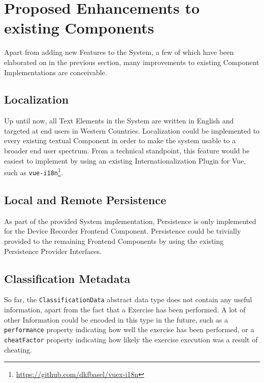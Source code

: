 \section{Proposed Enhancements to existing Components}
Apart from adding new Features to the System, a few of which have been elaborated on in the previous section, many improvements to existing Component Implementations are conceivable.

\subsection{Localization}
Up until now, all Text Elements in the System are written in English and targeted at end users in Western Countries. Localization could be implemented to every existing textual Component in order to make the system usable to a broader end user spectrum. From a technical standpoint, this feature would be easiest to implement by using an existing Internationalization Plugin for Vue, such as \texttt{vue-i18n}\footnote{\url{https://github.com/dkfbasel/vuex-i18n}}.

\subsection{Local and Remote Persistence}
As part of the provided System implementation, Persistence is only implemented for the Device Recorder Frontend Component. Persistence could be trivially provided to the remaining Frontend Components by using the existing Persistence Provider Interfaces.

\subsection{Classification Metadata}
So far, the \texttt{ClassificationData} abstract data type does not contain any useful information, apart from the fact that a Exercise has been performed. A lot of other Information could be encoded in this type in the future, such as a \texttt{performance} property indicating how well the exercise has been performed, or a \texttt{cheatFactor} property indicating how likely the exercise execution was a result of cheating.
